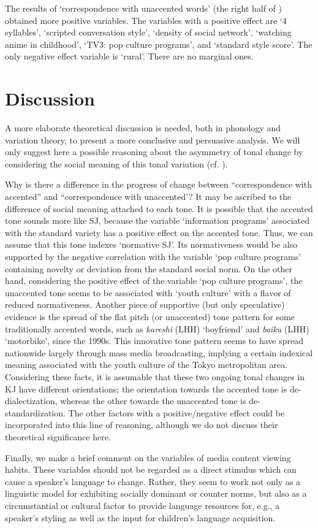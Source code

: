 \documentclass[output=paper]{LSP/langsci}
\begin{document}
The results of  ‘correspondence with unaccented words’ (the right half of ) obtained more positive variables. The variables with a positive effect are ‘4 syllables’, ‘scripted conversation style’, ‘density of social network’, ‘watching anime in childhood’, ‘TV3: pop culture programs’, and ‘standard style score’. The only negative effect variable is ‘rural’. There are no marginal ones.

\section{Discussion}
A more elaborate theoretical discussion is needed, both in phonology and variation theory, to present a more conclusive and persuasive analysis. We will only suggest here a possible reasoning about the asymmetry of tonal change by considering the social meaning of this tonal variation (cf. \citealt{eckert_variation_2008}). 

Why is there a difference in the progress of change between ``correspondence with accented'' and ``correspondence with unaccented'? It may be ascribed to the difference of social meaning attached to each tone. It is possible that the accented tone sounds more like SJ, because the variable `information programs' associated with the standard variety has a positive effect on the accented tone. Thus, we can assume that this tone indexes `normative SJ'. Its normativeness would be also supported by the negative correlation with the variable `pop culture programs' containing novelty or deviation from the standard social norm. On the other hand, considering the positive effect of the variable `pop culture programs', the unaccented tone seems to be associated with `youth culture' with a flavor of reduced normativeness. Another piece of supportive (but only speculative) evidence is the spread of the flat pitch (or unaccented) tone pattern for some traditionally accented words, such as \textit{kareshi }(LHH) `boyfriend' and \textit{baiku} (LHH) `motorbike', since the 1990s. This innovative tone pattern seems to have spread nationwide largely through mass media broadcasting, implying a certain indexical meaning associated with the youth culture of the Tokyo metropolitan area. Considering these facts, it is assumable that these two ongoing tonal changes in KJ have different orientations; the orientation towards the accented tone is de-dialectization, whereas the other towards the unaccented tone is de-standardization. The other factors with a positive/negative effect could be incorporated into this line of reasoning, although we do not discuss their theoretical significance here.

Finally, we make a brief comment on the variables of media content viewing habits. These variables should not be regarded as a direct stimulus which can cause a speaker’s language to change. Rather, they seem to work not only as a linguistic model for exhibiting socially dominant or counter norms, but also as a circumstantial or cultural factor to provide language resources for, e.g., a speaker’s styling as well as the input for children’s language acquisition.
     
\printbibliography[heading=subbibliography,notkeyword=this]
\end{document}
